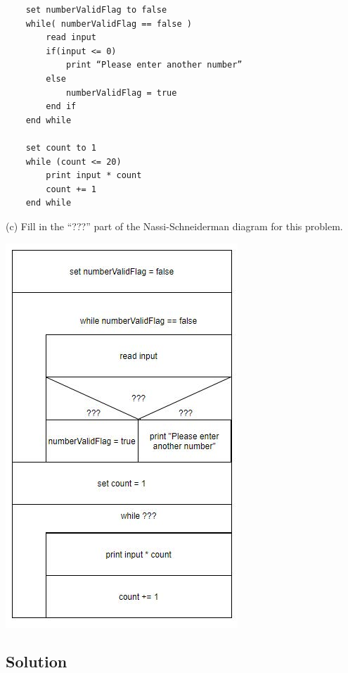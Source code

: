 \documentclass{article}
\begin{document}
    \begin{verbatim}
    set numberValidFlag to false
    while( numberValidFlag == false )
        read input
        if(input <= 0)
            print “Please enter another number”
        else
            numberValidFlag = true
        end if
    end while

    set count to 1
    while (count <= 20)
        print input * count
        count += 1
    end while
    \end{verbatim}

    (c) Fill in the “???” part of the Nassi-Schneiderman diagram for this problem.

    \begin{center}
        \includegraphics[scale=0.8]{Exercise 6_ Practice Problems c.jpg}
    \end{center}

    \subsection*{Solution}
\end{document}
